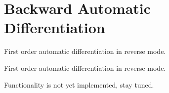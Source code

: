 \hypertarget{group__numpp__differentiation__backward__automatic}{}\section{Backward Automatic Differentiation}
\label{group__numpp__differentiation__backward__automatic}


First order automatic differentiation in reverse mode.  


First order automatic differentiation in reverse mode. 

Functionality is not yet implemented, stay tuned. 